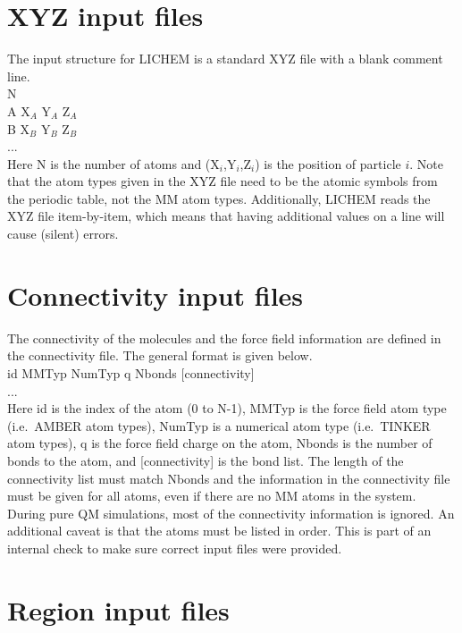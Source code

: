 \documentclass[12pt]{report}
\begin{document}
\section{XYZ input files}

The input structure for LICHEM is a standard XYZ file with a blank comment
line. \\

N \\

A  X$_A$  Y$_A$  Z$_A$ \\
B  X$_B$  Y$_B$  Z$_B$ \\
... \\

Here N is the number of atoms and (X$_i$,Y$_i$,Z$_i$) is the position of
particle $i$.
Note that the atom types given in the XYZ file need to be the atomic symbols
from the periodic table, not the MM atom types.
Additionally, LICHEM reads the XYZ file item-by-item, which means that having
additional values on a line will cause (silent) errors.

\section{Connectivity input files}

The connectivity of the molecules and the force field information are defined
in the connectivity file.
The general format is given below. \\

id MMTyp NumTyp q Nbonds [connectivity] \\
... \\

Here id is the index of the atom (0 to N-1), MMTyp is the force field atom
type (i.e.\ AMBER atom types), NumTyp is a numerical atom type (i.e.\ TINKER
atom types), q is the force field charge on the atom, Nbonds is the number of
bonds to the atom, and [connectivity] is the bond list.
The length of the connectivity list must match Nbonds and the information in
the connectivity file must be given for all atoms, even if there are no MM
atoms in the system.
During pure QM simulations, most of the connectivity information is ignored.
An additional caveat is that the atoms must be listed in order.
This is part of an internal check to make sure correct input files were
provided.
\newpage
\section{Region input files}
\end{document}
